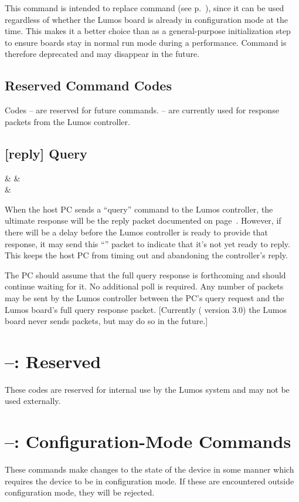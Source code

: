 \documentclass[letterpaper,twoside,onecolumn,openright,final]{memoir}
\begin{document}
This command is intended to replace command  (see p.~\pageref{cmd:xprivold}), since it can be
used regardless of whether the Lumos board is already in configuration mode at the time.  This makes
it a better choice than  as a general-purpose initialization step to ensure boards stay in
normal run mode during a performance.  Command  is therefore deprecated and may disappear
in the future.

\subsection{Reserved Command Codes}
Codes -- are reserved for future commands.  -- are currently used
for response packets from the Lumos controller.

\subsection{ [reply] Query }
\begin{BF}
	 &  &  \\
	 & 
\end{BF}
When the host PC sends a ``query'' command to the Lumos controller, the ultimate response will be
the reply packet documented on page~\pageref{bb:query-reply}.  However, if there will be a delay
before the Lumos controller is ready to provide that response, it may send this ``''
packet to indicate that it's not yet ready to reply.  This keeps the host PC from timing out and
abandoning the controller's reply.

The PC should assume that the full query response is forthcoming and should 
continue waiting for it.  No additional poll is required.  Any number of
 packets may be sent by the Lumos controller between the PC's
query request and the Lumos board's full query response packet.  [Currently
( version 3.0) the Lumos board never sends  packets,
but may do so in the future.]


\section{--: Reserved}
These codes are reserved for internal use by the Lumos system and may not be used externally.

\section{--: Configuration-Mode Commands}
These commands make changes to the state of the device in some manner which requires the device to
be in configuration mode.  If these are encountered outside configuration mode, they will be 
rejected.
\end{document}
